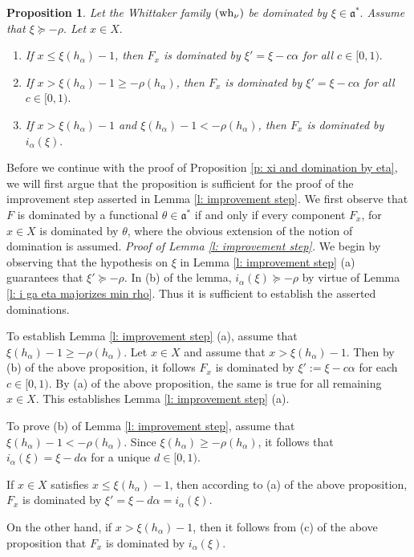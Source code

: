 \documentclass[12pt,a4paper]{article}
\newtheorem{Prop}[Thm]{Proposition}
\newenvironment{prop}[0]{\begin{Prop}\noindent}%
{\end{Prop}}
\def\medno{\medbreak\noindent}
\def\itema{\vspace{-1mm}\item[{\rm (a)}]}
\def\itemb{\item[{\rm (b)}]}
\def\itemc{\item[{\rm (c)}]}
\def\ga{\alpha}
\def\got#1{\mathfrak #1}
\def\fa{{\got a}}
\numberwithin{Thm}{section}
\numberwithin{equation}{section}
\numberwithin{equation}{section}
\def\fad{{\fa^*}}
\def\wh{{\rm wh}}
\def\xx{x}
\def\xxi{\xi}
\begin{document}
\begin{prop}
\label{p: xi and domination by eta}
Let the Whittaker family $(\wh_\nu)$ be dominated by $\xxi \in \fad.$ 
Assume that $\xxi\succeq -\rho.$ 
Let $\xx \in X.$ 
\begin{enumerate}
\itema If $\xx \leq \xxi(h_\ga) -1$, then $F_\xx$ is dominated by 
$\xxi' = \xxi - c \ga$ for all $c \in [0,1).$ 
\itemb If $\xx > \xxi(h_\ga) - 1 \geq  -\rho(h_\ga)$, 
then $F_\xx$ is dominated by 
$\xxi' = \xxi - c \ga$ for all $c \in [0,1).$ 
\itemc
If $\xx > \xxi(h_\ga) - 1 $ and $\xxi(h_\ga) - 1 < -\rho(h_\ga)$,
then $F_\xx$ is dominated 
by $i_\ga(\xxi).$ 
\end{enumerate}
\end{prop}

Before we continue with the proof of Proposition \ref{p: xi and  domination by eta}, we will first argue that the proposition is sufficient for the proof of the improvement step asserted in
Lemma \ref{l: improvement step}. We first observe that $F$ is dominated 
by a functional $\theta \in \fad$ if and only if every component $F_\xx$, for 
$\xx \in X$ is dominated by $\theta$, where the obvious extension  of the notion 
of domination is assumed. 
\medno
{\em Proof of Lemma \ref{l: improvement step}. }
We begin by observing that the hypothesis on $\xxi$ in Lemma \ref{l: improvement step} (a) 
guarantees that $\xxi' \succeq -\rho.$ In (b) of the lemma, $i_\ga(\xxi) \succeq -\rho$ 
by virtue of Lemma \ref{l: i ga eta majorizes min rho}. Thus it is sufficient to establish the asserted dominations.

To establish Lemma \ref{l: improvement step} (a), assume that $\xxi(h_\ga) - 1 \geq  -\rho(h_\ga).$  Let $\xx \in X$ and assume that 
$\xx > \xxi(h_\ga) -1.$ Then by (b) of the above proposition, it follows 
$F_\xx$ is dominated by $\xxi':= \xxi - c\ga$ for each $c \in [0,1).$ 
By (a) of the above proposition, the same is true 
for all remaining $\xx \in X$.  
This establishes Lemma \ref{l: improvement step} (a).

To prove (b) of Lemma \ref{l: improvement step}, assume that  $\xxi(h_\ga) - 1 <  -\rho(h_\ga).$ 
Since $\xxi(h_\ga) \geq -\rho(h_\ga)$, it follows that 
$i_\ga(\xxi) = \xxi - d\ga $ for a unique $d \in [0,1).$  

If $\xx \in X$ satisfies $\xx \leq \xxi(h_\ga) - 1$, then according to (a) of the above proposition,
$F_\xx$ is dominated  by $\xxi' = \xxi - d \ga = i_\ga(\xxi).$ 

On the other hand, if $\xx > \xxi(h_\ga) - 1$, then it follows from  
(c) of the above proposition that $F_\xx$ is dominated by  $i_\ga(\xxi).$  
\end{document}
